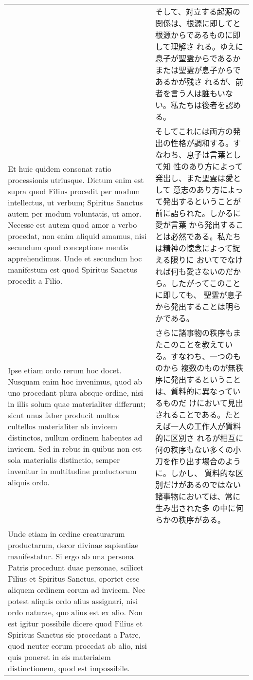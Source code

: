 \documentclass[10pt]{jsarticle} %
\begin{document}
\begin{longtable}{p{21em}p{21em}}
&

 そして、対立する起源の関係は、根源に即してと根源からであるものに即して理解さ
 れる。ゆえに息子が聖霊からであるかまたは聖霊が息子からであるかが残さ
 れるが、前者を言う人は誰もいない。私たちは後者を認める。


\\



Et huic quidem consonat ratio processionis
utriusque. Dictum enim est supra quod Filius procedit per modum
intellectus, ut verbum; Spiritus Sanctus autem per modum
voluntatis, ut amor. Necesse est autem quod amor a verbo procedat, non
enim aliquid amamus, nisi secundum quod conceptione mentis
apprehendimus. Unde et secundum hoc manifestum est quod
 Spiritus Sanctus procedit a Filio. 



&

そしてこれには両方の発出の性格が調和する。すなわち、息子は言葉として知
 性のあり方によって発出し、また聖霊は愛として
意志のあり方によって発出するということが前に語られた。しかるに愛が言葉
 から発出することは必然である。私たちは精神の懐念によって捉える限りに
 おいてでなければ何も愛さないのだから。したがってこのことに即しても、
 聖霊が息子から発出することは明らかである。

\\



Ipse etiam ordo rerum hoc
docet. Nusquam enim hoc invenimus, quod ab uno procedant plura absque
ordine, nisi in illis solum quae materialiter differunt; sicut unus
faber producit multos cultellos materialiter ab invicem distinctos,
nullum ordinem habentes ad invicem. Sed in rebus in quibus non est
sola materialis distinctio, semper invenitur in multitudine
productorum aliquis ordo. 


&

さらに諸事物の秩序もまたこのことを教えている。すなわち、一つのものから
 複数のものが無秩序に発出するということは、質料的に異なっているものだ
 けにおいて見出されることである。たとえば一人の工作人が質料的に区別さ
 れるが相互に何の秩序もない多くの小刀を作り出す場合のように。しかし、
 質料的な区別だけがあるのではない諸事物においては、常に生み出された多
 の中に何らかの秩序がある。


\\




Unde etiam in ordine creaturarum
productarum, decor divinae sapientiae manifestatur. Si ergo ab una
persona Patris procedunt duae personae, scilicet Filius et 
 Spiritus Sanctus, oportet esse aliquem ordinem eorum ad invicem. Nec
potest aliquis ordo alius assignari, nisi ordo naturae, quo alius est
ex alio. 
Non est igitur possibile dicere quod Filius et 
 Spiritus Sanctus sic procedant a Patre, quod neuter eorum procedat ab
alio, nisi quis poneret in eis materialem distinctionem, quod est
impossibile. 



\end{longtable}
\end{document}
